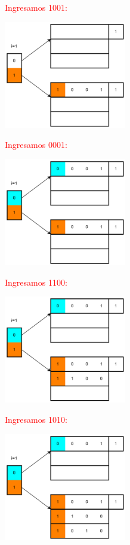 \documentclass{templateNote}
\begin{document}
\begin{itemize}
\begin{enumerate}
        \textcolor{red}{
            Ingresamos 1001:
            \begin{center}
                \includegraphics[width=0.4\textwidth]{diagram/Problema2-11.png}
            \end{center}
            Ingresamos 0001:
            \begin{center}
                \includegraphics[width=0.4\textwidth]{diagram/Problema2-12.png}
            \end{center}
            \newpage
            Ingresamos 1100:
            \begin{center}
                \includegraphics[width=0.4\textwidth]{diagram/Problema2-13.png}
            \end{center}
            Ingresamos 1010:
            \begin{center}
                \includegraphics[width=0.4\textwidth]{diagram/Problema2-14.png}

\end{center}}
\end{enumerate}
\end{itemize}
\end{document}
